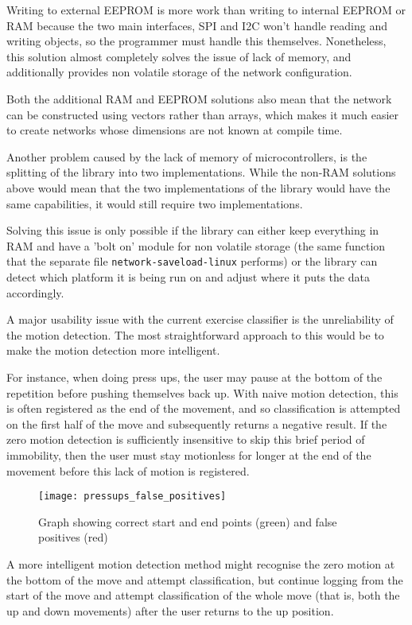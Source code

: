 \documentclass[a4paper]{article}
\begin{document}
Writing to external EEPROM is more work than writing to internal EEPROM or RAM because the two main interfaces, SPI and I2C won't handle reading and writing objects, so the programmer must handle this themselves. Nonetheless, this solution almost completely solves the issue of lack of memory, and additionally provides non volatile storage of the network configuration.

Both the additional RAM and EEPROM solutions also mean that the network can be constructed using vectors rather than arrays, which makes it much easier to create networks whose dimensions are not known at compile time. 

Another problem caused by the lack of memory of microcontrollers, is the splitting of the library into two implementations. While the non-RAM solutions above would mean that the two implementations of the library would have the same capabilities, it would still require two implementations.

Solving this issue is only possible if the library can either keep everything in RAM and have a 'bolt on' module for non volatile storage (the same function that the separate file \lstinline{network-saveload-linux} performs) or the library can detect which platform it is being run on and adjust where it puts the data accordingly. 

A major usability issue with the current exercise classifier is the unreliability of the motion detection. The most straightforward approach to this would be to make the motion detection more intelligent. 

For instance, when doing press ups, the user may pause at the bottom of the repetition before pushing themselves back up. With naive motion detection, this is often registered as the end of the movement, and so classification is attempted on the first half of the move and subsequently returns a negative result.
If the zero motion detection is sufficiently insensitive to skip this brief period of immobility, then the user must stay motionless for longer at the end of the movement before this lack of motion is registered.

\begin{figure}[H]
    \centering
        \texttt{[image: pressups\_false\_positives]}
        \caption{Graph showing correct start and end points (green) and false positives (red)}
        \label{fig:pu_false_positive}
\end{figure}

A more intelligent motion detection method might recognise the zero motion at the bottom of the move and attempt classification, but continue logging from the start of the move and attempt classification of the whole move (that is, both the up and down movements) after the user returns to the up position.
\end{document}
